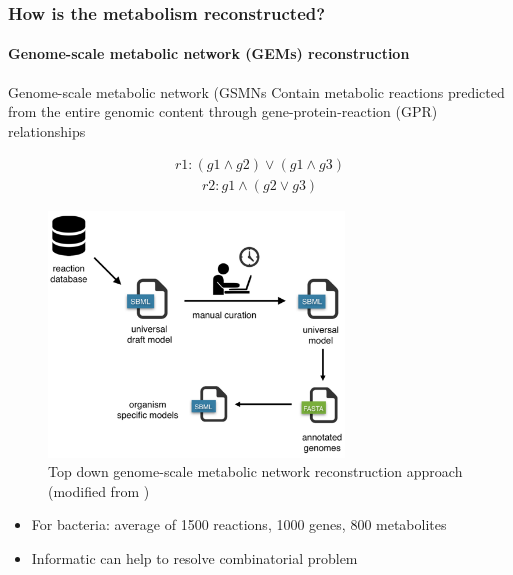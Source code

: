 \documentclass[8pt]{beamer}
\begin{document}
\begin{frame}
\frametitle{How is the metabolism reconstructed?}
\framesubtitle{Genome-scale metabolic network (GEMs) reconstruction}

\begin{exampleblock}{Genome-scale metabolic network (GSMNs}
Contain metabolic reactions predicted from the entire genomic content through gene-protein-reaction (GPR) relationships \tiny \citep{Thiele.2010}
\end{exampleblock}
\begin{minipage}{0.3\textwidth}
\begin{align*}
    r1 : (g1 \land g2) \lor (g1 \land g3)
\end{align*}
\begin{align*}
    r2 : g1 \land (g2 \lor g3)
\end{align*}
\end{minipage}%
\begin{minipage}{0.7\textwidth}
\begin{figure}
\includegraphics[width=0.7\textwidth]{figures/top-down}
\caption{Top down genome-scale metabolic network reconstruction approach \tiny (modified from \cite{Machado2018})}
\end{figure}
\end{minipage}
\vspace{-0.4cm}
\begin{block}{}
\begin{itemize}
\item For bacteria: average of 1500 reactions, 1000 genes, 800 metabolites
\item Informatic can help to resolve combinatorial problem
\end{itemize}
\end{block}
\end{frame}
\end{document}
